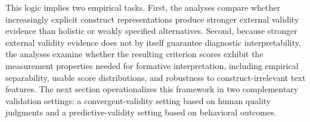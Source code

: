 This logic implies two empirical tasks. First, the analyses compare whether increasingly explicit construct representations produce stronger external validity evidence than holistic or weakly specified alternatives. Second, because stronger external validity evidence does not by itself guarantee diagnostic interpretability, the analyses examine whether the resulting criterion scores exhibit the measurement properties needed for formative interpretation, including empirical separability, usable score distributions, and robustness to construct-irrelevant text features. 
The next section operationalizes this framework in two complementary validation settings: a convergent-validity setting based on human quality judgments and a predictive-validity setting based on behavioral outcomes.



